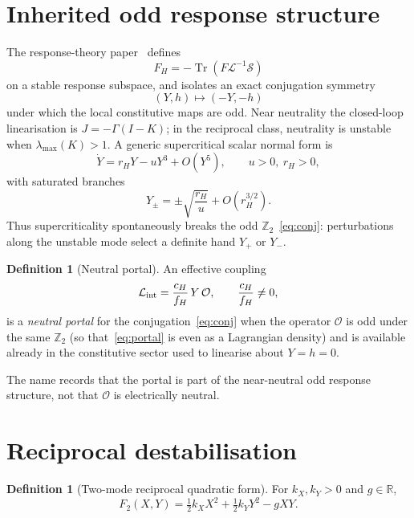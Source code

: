 \documentclass[11pt]{article}
\theoremstyle{definition}
\newtheorem{definition}[theorem]{Definition}
\theoremstyle{remark}
\newcommand{\Tr}{\operatorname{Tr}}
\begin{document}
\section{Inherited odd response structure}
\label{sec:inherited}
The response-theory paper~\cite{boyd2026response} defines
\begin{equation}
\label{eq:FH}
F_H=-\Tr\!\left(F\mathcal L^{-1}\mathcal S\right)
\end{equation}
on a stable response subspace, and isolates an exact conjugation symmetry
\begin{equation}
\label{eq:conj}
(Y,h)\mapsto(-Y,-h)
\end{equation}
under which the local constitutive maps are odd.
Near neutrality the closed-loop linearisation is $J=-\Gamma(I-K)$; in the
reciprocal class, neutrality is unstable when $\lambda_{\max}(K)>1$.
A generic supercritical scalar normal form is
\begin{equation}
\label{eq:normal}
\dot Y=r_HY-uY^3+O(Y^5),\qquad u>0,\ r_H>0,
\end{equation}
with saturated branches
\begin{equation}
\label{eq:branches}
\boxed{Y_\pm=\pm\sqrt{\frac{r_H}{u}}+O(r_H^{3/2}).}
\end{equation}
Thus supercriticality spontaneously breaks the odd $\mathbb Z_2$~\eqref{eq:conj}:
perturbations along the unstable mode select a definite hand $Y_+$ or $Y_-$.

\begin{definition}[Neutral portal]
\label{def:neutral-portal}
An effective coupling
\begin{equation}
\label{eq:portal}
\mathcal L_{\rm int}=\frac{c_H}{f_H}\,Y\,\mathcal O,
\qquad \frac{c_H}{f_H}\neq0,
\end{equation}
is a \emph{neutral portal} for the conjugation~\eqref{eq:conj} when the operator
$\mathcal O$ is odd under the same $\mathbb Z_2$ (so that~\eqref{eq:portal} is
even as a Lagrangian density) and is available already in the constitutive
sector used to linearise about $Y=h=0$.
\end{definition}
The name records that the portal is part of the near-neutral odd response
structure, not that $\mathcal O$ is electrically neutral.

\section{Reciprocal destabilisation}
\label{sec:reciprocal}
\begin{definition}[Two-mode reciprocal quadratic form]
\label{def:F2}
For $k_X,k_Y>0$ and $g\in\mathbb R$,
\begin{equation}
F_2(X,Y)=\tfrac12 k_X X^2+\tfrac12 k_Y Y^2-gXY.
\end{equation}
\end{definition}
\end{document}
